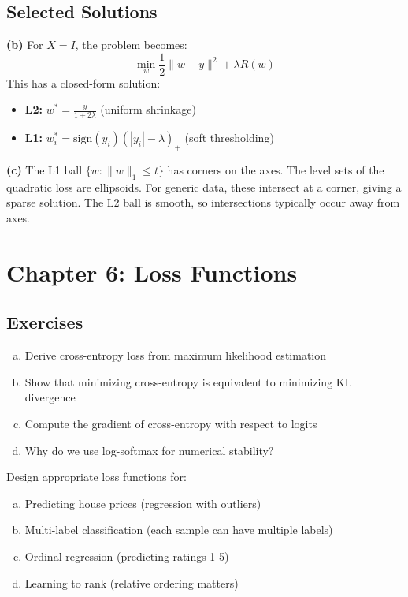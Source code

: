 \documentclass[../main.tex]{subfiles}
\begin{document}
\subsection{Selected Solutions}

\begin{solution}[Exercise 5.1(b,c)]
\textbf{(b)} For $X = I$, the problem becomes:
\[
\min_w \frac{1}{2}\|w - y\|^2 + \lambda R(w)
\]
This has a closed-form solution:
\begin{itemize}
    \item \textbf{L2:} $w^* = \frac{y}{1 + 2\lambda}$ (uniform shrinkage)
    \item \textbf{L1:} $w_i^* = \text{sign}(y_i)(|y_i| - \lambda)_+$ (soft thresholding)
\end{itemize}

\textbf{(c)} The L1 ball $\{w : \|w\|_1 \leq t\}$ has corners on the axes. The level sets of the quadratic loss are ellipsoids. For generic data, these intersect at a corner, giving a sparse solution. The L2 ball is smooth, so intersections typically occur away from axes.
\end{solution}

\section{Chapter 6: Loss Functions}\label{sec:ex-loss}

\subsection{Exercises}

\begin{simpleexercise}
\begin{enumerate}[(a)]
    \item Derive cross-entropy loss from maximum likelihood estimation
    \item Show that minimizing cross-entropy is equivalent to minimizing KL divergence
    \item Compute the gradient of cross-entropy with respect to logits
    \item Why do we use log-softmax for numerical stability?
\end{enumerate}
\end{simpleexercise}

\begin{simpleexercise}
Design appropriate loss functions for:
\begin{enumerate}[(a)]
    \item Predicting house prices (regression with outliers)
    \item Multi-label classification (each sample can have multiple labels)
    \item Ordinal regression (predicting ratings 1-5)
    \item Learning to rank (relative ordering matters)
\end{enumerate}
\end{simpleexercise}
\end{document}
